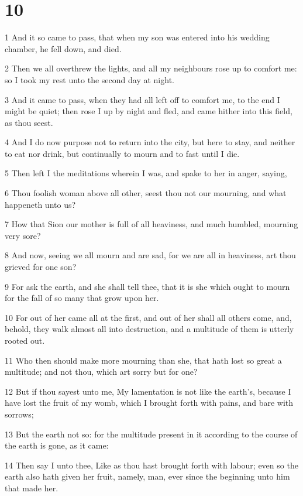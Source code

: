 \chapter{10}

\par 1 And it so came to pass, that when my son was entered into his wedding chamber, he fell down, and died.
\par 2 Then we all overthrew the lights, and all my neighbours rose up to comfort me: so I took my rest unto the second day at night.
\par 3 And it came to pass, when they had all left off to comfort me, to the end I might be quiet; then rose I up by night and fled, and came hither into this field, as thou seest.
\par 4 And I do now purpose not to return into the city, but here to stay, and neither to eat nor drink, but continually to mourn and to fast until I die.
\par 5 Then left I the meditations wherein I was, and spake to her in anger, saying,
\par 6 Thou foolish woman above all other, seest thou not our mourning, and what happeneth unto us?
\par 7 How that Sion our mother is full of all heaviness, and much humbled, mourning very sore?
\par 8 And now, seeing we all mourn and are sad, for we are all in heaviness, art thou grieved for one son?
\par 9 For ask the earth, and she shall tell thee, that it is she which ought to mourn for the fall of so many that grow upon her.
\par 10 For out of her came all at the first, and out of her shall all others come, and, behold, they walk almost all into destruction, and a multitude of them is utterly rooted out.
\par 11 Who then should make more mourning than she, that hath lost so great a multitude; and not thou, which art sorry but for one?
\par 12 But if thou sayest unto me, My lamentation is not like the earth's, because I have lost the fruit of my womb, which I brought forth with pains, and bare with sorrows;
\par 13 But the earth not so: for the multitude present in it according to the course of the earth is gone, as it came:
\par 14 Then say I unto thee, Like as thou hast brought forth with labour; even so the earth also hath given her fruit, namely, man, ever since the beginning unto him that made her.
